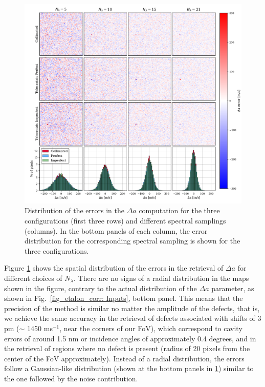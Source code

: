 \begin{figure}
    \centering
    \includegraphics[width=\textwidth]{figures/EtalonPaper/Maps_Fov_Hist.pdf}
    \caption{Distribution of the errors in the $\Delta a$ computation for the three configurations (first three rows) and different spectral samplings (columns). In the bottom panels of each column, the error distribution for the corresponding spectral sampling is shown for the three configurations. }
   \label{fig_etalon_corr:FOV}
\end{figure}

Figure \ref{fig_etalon_corr:FOV} shows the spatial distribution of the errors in the retrieval of $\Delta a$ for different choices of $N_\lambda$. There are no signs of a radial distribution in the maps shown in the figure, contrary to the actual distribution of the $\Delta a$ parameter, as shown in Fig.~\ref{fig_etalon_corr: Inputs}, bottom panel. This means that the precision of the method is similar no matter the amplitude of the defects, that is, we achieve the same accuracy in the retrieval of defects associated with shifts of 3 pm ($\sim$ 1450 ms$^{-1}$, near the corners of our FoV), which correspond to cavity errors of around 1.5 nm or incidence angles of approximately 0.4 degrees, and in the retrieval of regions where no defect is present (radius of 20 pixels from the center of the FoV approximately). Instead of a radial distribution, the errors follow a Gaussian-like distribution (shown at the bottom panels in \ref{fig_etalon_corr:FOV}) similar to the one followed by the noise contribution.

